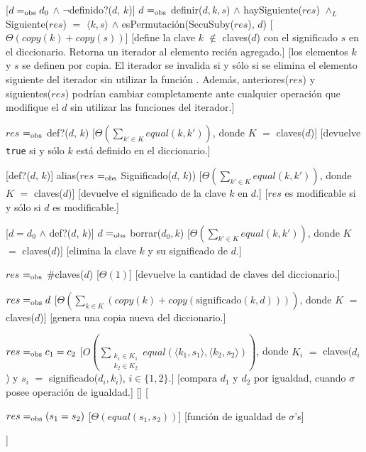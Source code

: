 \documentclass[a4paper,10pt]{article}
\begin{document}
\begin{Interfaz}
  [$d =_{\mathrm{obs}} d_0$ $\land$ $\lnot$definido?($d$, $k$)]
  {$d$ $=_{\mathrm{obs}}$ definir($d, k, s$) $\land$ haySiguiente($res$) $\land_L$ Siguiente($res$) $=$ $\langle k,s\rangle$ $\land$ esPermutación(SecuSuby($res$), $d$)}
  [$\Theta(copy(k) + copy(s))$]
  [define la clave $k$ $\not\in$ claves($d$) con el significado $s$ en el diccionario. Retorna un iterador al elemento recién agregado.]
  [los elementos $k$ y $s$ se definen por copia. El iterador se invalida si y sólo si se elimina el elemento siguiente del iterador sin utilizar la función . Además, anteriores($res$) y siguientes($res$) podrían cambiar completamente ante cualquier operación que modifique el $d$ sin utilizar las funciones del iterador.]

  {$res$ $=_{\mathrm{obs}}$ def?($d$, $k$)}
  [$\Theta(\sum_{k' \in K}equal(k,k'))$, donde $K$ $=$ claves($d$)]
  [devuelve \texttt{true} si y sólo $k$ está definido en el diccionario.]

  [def?($d$, $k$)]
  {alias($res$ $=_{\mathrm{obs}}$ Significado($d$, $k$))}
  [$\Theta(\sum_{k' \in K}equal(k,k'))$, donde $K$ $=$ claves($d$)]
  [devuelve el significado de la clave $k$ en $d$.]
  [$res$ es modificable si y sólo si $d$ es modificable.]

  [$d = d_0$ $\land$ def?($d$, $k$)]
  {$d$ $=_{\mathrm{obs}}$ borrar($d_0, k$)}
  [$\Theta(\sum_{k' \in K}equal(k,k'))$, donde $K$ $=$ claves($d$)]
  [elimina la clave $k$ y su significado de $d$.]

  {$res$ $=_{\mathrm{obs}}$ \#claves($d$)}
  [$\Theta(1)$]
  [devuelve la cantidad de claves del diccionario.]

  {$res =_{\mathrm{obs}} d$}
  [$\displaystyle\Theta\left(\sum_{k \in K}\left(copy(k) + copy(\text{significado}(k,d))\right)\right)$, donde $K$ $=$ claves($d$)]
  [genera una copia nueva del diccionario.]

  {$res =_{\mathrm{obs}} c_1 = c_2$}
  [$\displaystyle O\left(\sum_{\substack{k_1 \in K_1\\k_2\in K_2}}equal(\langle k_1,s_1\rangle, \langle k_2, s_2 \rangle)\right)$, donde $K_i$ $=$ claves($d_i$) y $s_i$ $=$ significado($d_i, k_i$), $i \in \{1,2\}$.]
  [compara $d_1$ y $d_2$ por igualdad, cuando $\sigma$ posee operación de igualdad.]
  []%
  [{\parbox[t]{\textwidth-3cm}{%
    {$res =_{\mathrm{obs}} (s_1 = s_2)$}
    [$\Theta(equal(s_1, s_2))$]
    [función de igualdad de $\sigma$'s]
  }}]



\end{Interfaz}
\end{document}
